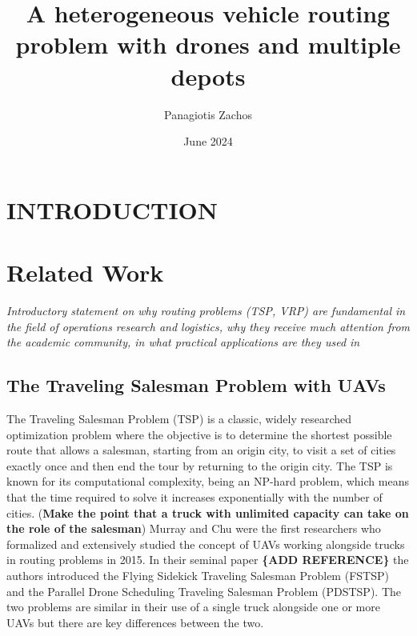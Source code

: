 \documentclass{article}
\title{A heterogeneous vehicle routing problem with drones and multiple depots}
\author{Panagiotis Zachos}
\date{June 2024}
\begin{document}
	\maketitle
	\section{INTRODUCTION}
	
	
	\section{Related Work}
	\textit{Introductory statement on why routing problems (TSP, VRP) are fundamental in the field of operations research and logistics, why they receive much attention from the academic community, in what practical applications are they used in}
	
	\subsection{The Traveling Salesman Problem with UAVs}
	The Traveling Salesman Problem (TSP) is a classic, widely researched optimization problem where the objective is to determine the shortest possible route that allows a salesman, starting from an origin city, to visit a set of cities exactly once and then end the tour by returning to the origin city. The TSP is known for its computational complexity, being an NP-hard problem, which means that the time required to solve it increases exponentially with the number of cities.
	(\textbf{Make the point that a truck with unlimited capacity can take on the role of the salesman}) 
	Murray and Chu were the first researchers who formalized and extensively studied the concept of UAVs working alongside trucks in routing problems in 2015. In their seminal paper \textbf{\{ADD REFERENCE\}} the authors introduced the Flying Sidekick Traveling Salesman Problem (FSTSP) and the Parallel Drone Scheduling Traveling Salesman Problem (PDSTSP). The two problems are similar in their use of a single truck alongside one or more UAVs but there are key differences between the two. 
	
\end{document}

